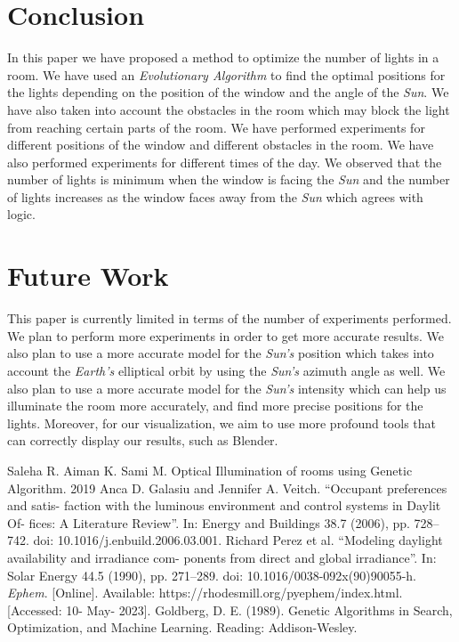 \documentclass[conference]{IEEEtran}
\begin{document}
\section{Conclusion}
In this paper we have proposed a method to optimize the number of lights in a
room. We have used an \textit{Evolutionary Algorithm} to find the optimal
positions for the lights depending on the position of the window and the angle
of the \textit{Sun}. We have also taken into account the obstacles in the room
which may block the light from reaching certain parts of the room. We have
performed experiments for different positions of the window and different
obstacles in the room. We have also performed experiments for different times of
the day. We observed that the number of lights is minimum when the window is
facing the \textit{Sun} and the number of lights increases as the window faces
away from the \textit{Sun} which agrees with logic.

\section{Future Work}
This paper is currently limited in terms of the number of experiments
performed. We plan to perform more experiments in order to get more accurate
results. We also plan to use a more accurate model for the \textit{Sun's}
position which takes into account the \textit{Earth's} elliptical orbit by
using the \textit{Sun's} azimuth angle as well. We also plan to use a more
accurate model for the \textit{Sun's} intensity which can help us illuminate
the room more accurately, and find more precise positions for the lights. Moreover, for our visualization, we aim to use more profound tools that can correctly display our results, such as Blender.


\begin{thebibliography}{00}
     Saleha R. Aiman K. Sami M. Optical Illumination of rooms using Genetic
    Algorithm. 2019
     Anca D. Galasiu and Jennifer A. Veitch. “Occupant preferences and satis-
faction with the luminous environment and control systems in Daylit Of-
fices: A Literature Review”. In: Energy and Buildings 38.7 (2006), pp. 728–
742. doi: 10.1016/j.enbuild.2006.03.001.
     Richard Perez et al. “Modeling daylight availability and irradiance com-
ponents from direct and global irradiance”. In: Solar Energy 44.5 (1990),
pp. 271–289. doi: 10.1016/0038-092x(90)90055-h.
     \textit{Ephem}. [Online]. Available: https://rhodesmill.org/pyephem/index.html. [Accessed: 10- May- 2023].
    \label{ref9} Goldberg, D. E. (1989). Genetic Algorithms in Search, Optimization, and Machine Learning. Reading: Addison-Wesley.
\end{thebibliography}
\end{document}
